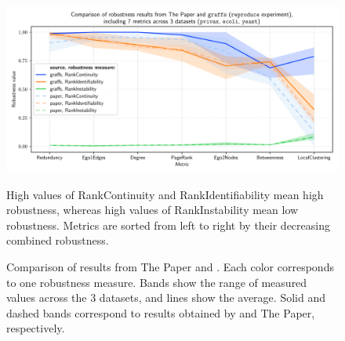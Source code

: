 \begin{figure}
    \includegraphics[width=\linewidth]{plot_reproduction.pdf}
    \vspace*{-0.8cm}
    \caption{Comparison of results from The Paper and \graffs.
    Each color corresponds to one robustness measure.
    Bands show the range of measured values across the 3 datasets, and lines show the average.
    Solid and dashed bands correspond to results obtained by \graffs and The Paper, respectively.}
    \label{fig:plot_reproduction}
    \footnotesize\justify\vspace{-0.4\baselineskip}
    High values of RankContinuity and RankIdentifiability mean high robustness, whereas high values of RankInstability mean low robustness.
    Metrics are sorted from left to right by their decreasing combined robustness.
    \vspace*{-2mm}
\end{figure}
